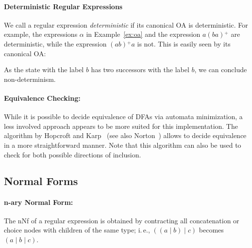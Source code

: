 \documentclass[a4paper,11pt, svgnames,titlepage]{article}
\newcommand{\rxp}{{^\mathtt{+}}}
\DeclareMathOperator{\ror}{\mathtt{|}}
\begin{document}
\paragraph{Deterministic Regular Expressions} We call a regular expression \emph{deterministic} if its canonical OA is deterministic. For example, the expressions $\alpha$ in Example~\ref{ex:oa} and the expression $a(ba)\rxp$ are deterministic, while the expression $(ab)\rxp a$ is not. This is easily seen by its canonical OA:
\begin{center}
\end{center}
As the state with the label $b$ has two successors with the label $b$, we can conclude non-determinism. 

\paragraph{Equivalence Checking:} While it is possible to decide equivalence of DFAs via automata minimization, a less involved approach appears to be more suited for this implementation. The algorithm by Hopcroft and Karp~\cite{hop:lin} (see also Norton~\cite{nor:alg}) allows to decide equivalence in a more straightforward manner. Note that this algorithm can also be used to check for both possible directions of inclusion.

\subsection{Normal Forms}
\paragraph{n-ary Normal Form:} The nNf of a regular expression is obtained by contracting all concatenation or choice nodes with children of the same type; i.\,e., $((a\ror b)\ror c)$ becomes $(a \ror b \ror c)$.
\end{document}
